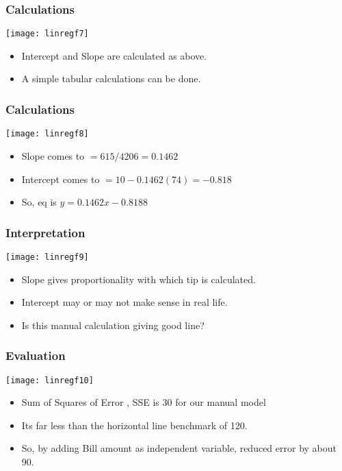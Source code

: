 \begin{frame}[fragile]\frametitle{Calculations}
\begin{center}
\texttt{[image: linregf7]}
\end{center}
\begin{itemize}
\item Intercept and Slope are calculated as above.
\item A simple tabular calculations can be done.
\end{itemize}
\end{frame}

\begin{frame}[fragile]\frametitle{Calculations}
\begin{center}
\texttt{[image: linregf8]}
\end{center}
\begin{itemize}
\item Slope comes to $= 615/4206 = 0.1462$
\item Intercept comes to $= 10 - 0.1462(74) = -0.818$
\item So, eq is $y = 0.1462x - 0.8188$
\end{itemize}
\end{frame}


\begin{frame}[fragile]\frametitle{Interpretation}
\begin{center}
\texttt{[image: linregf9]}
\end{center}
\begin{itemize}
\item Slope gives proportionality with which tip is calculated.
\item Intercept may or may not make sense in real life.
\item Is this manual calculation giving good line?
\end{itemize}
\end{frame}

\begin{frame}[fragile]\frametitle{Evaluation}
\begin{center}
\texttt{[image: linregf10]}
\end{center}
\begin{itemize}
\item Sum of Squares of Error , SSE is 30 for our manual model
\item Its far less than the horizontal line benchmark of 120.
\item So, by adding Bill amount as independent variable, reduced error by about 90.
\end{itemize}
\end{frame}

